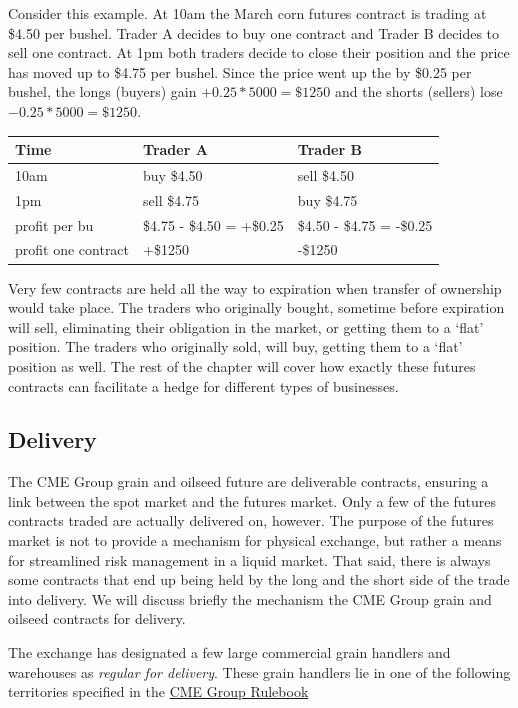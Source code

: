 \documentclass[
]{book}
\begin{document}
Consider this example. At 10am the March corn futures contract is trading at \$4.50 per bushel. Trader A decides to buy one contract and Trader B decides to sell one contract. At 1pm both traders decide to close their position and the price has moved up to \$4.75 per bushel. Since the price went up the by \$0.25 per bushel, the longs (buyers) gain \(+0.25*5000 = \$1250\) and the shorts (sellers) lose \(-0.25*5000 = \$1250\).

\begin{longtable}[]{@{}lll@{}}
\toprule
Time & Trader A & Trader B\tabularnewline
\midrule
\endhead
10am & buy \$4.50 & sell \$4.50\tabularnewline
1pm & sell \$4.75 & buy \$4.75\tabularnewline
profit per bu & \$4.75 - \$4.50 = +\$0.25 & \$4.50 - \$4.75 = -\$0.25\tabularnewline
profit one contract & +\$1250 & -\$1250\tabularnewline
\bottomrule
\end{longtable}

Very few contracts are held all the way to expiration when transfer of ownership would take place. The traders who originally bought, sometime before expiration will sell, eliminating their obligation in the market, or getting them to a `flat' position. The traders who originally sold, will buy, getting them to a `flat' position as well. The rest of the chapter will cover how exactly these futures contracts can facilitate a hedge for different types of businesses.

\hypertarget{delivery}{%
\subsection{Delivery}\label{delivery}}

The CME Group grain and oilseed future are deliverable contracts, ensuring a link between the spot market and the futures market. Only a few of the futures contracts traded are actually delivered on, however. The purpose of the futures market is not to provide a mechanism for physical exchange, but rather a means for streamlined risk management in a liquid market. That said, there is always some contracts that end up being held by the long and the short side of the trade into delivery. We will discuss briefly the mechanism the CME Group grain and oilseed contracts for delivery.

The exchange has designated a few large commercial grain handlers and warehouses as \emph{regular for delivery}. These grain handlers lie in one of the following territories specified in the \href{https://www.cmegroup.com/rulebook/CBOT/II/10/10.pdf}{CME Group Rulebook}
\end{document}
